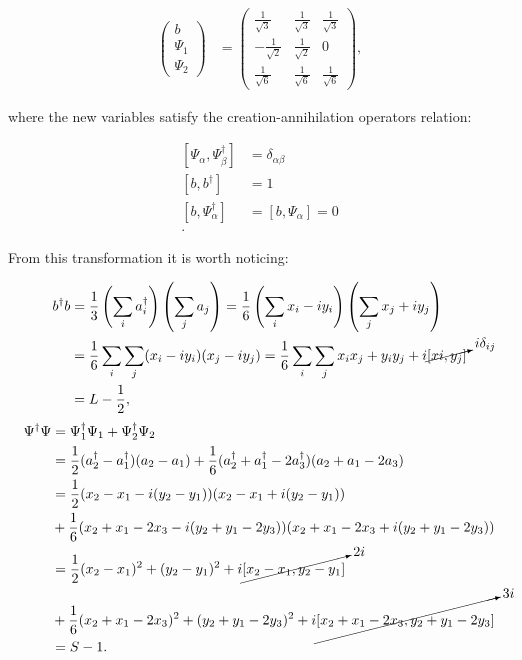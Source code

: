 \begin{align*}
\begin{pmatrix} b \\ \Psi_1 \\ \Psi_2 \end{pmatrix} &= 
\begin{pmatrix}\frac{1}{\sqrt{3}} &\frac{1}{\sqrt{3}}&\frac{1}{\sqrt{3}}\\
				-\frac{1}{\sqrt{2}}&\frac{1}{\sqrt{2}}&0\\
				\frac{1}{\sqrt{6}}&\frac{1}{\sqrt{6}}&\frac{1}{\sqrt{6}}\end{pmatrix},
\end{align*}

where the new variables satisfy the creation-annihilation operators relation:

\begin{align*}
\left[ \Psi_\alpha,\Psi_\beta^\dagger\right] &= \delta_{\alpha\beta}\\
\left[ b,b^\dagger\right] &= 1\\
\left[ b,\Psi_\alpha^\dagger\right] &=\left[ b,\Psi_\alpha\right] = 0\\.
\end{align*}

From this transformation it is worth noticing:

\begin{align*}
b^\dagger b &= \frac{1}{3}\left( \sum_i a_i^\dagger \right)\left( \sum_j a_j \right) =  \frac{1}{6}\left( \sum_i x_i-iy_i \right)\left( \sum_j x_j+iy_j \right)\\
&= \frac{1}{6}\sum_i\sum_j(x_i-iy_i)(x_j-iy_j) = \frac{1}{6}\sum_i\sum_jx_ix_j+y_iy_j +i\cancelto{i\delta_{ij}}{[xi,y_j]}\\
&= L - \frac{1}{2},
\end{align*}
\small
\begin{align*}
\Psi^\dagger\Psi &= \Psi_1^\dagger\Psi_1 +\Psi_2^\dagger\Psi_2\\
&= \frac{1}{2} (a_2^\dagger-a_1^\dagger)(a_2-a_1) + \frac{1}{6}(a_2^\dagger+a_1^\dagger-2a_3^\dagger)(a_2+a_1-2a_3)\\
&= \frac{1}{2} (x_2-x_1 -i(y_2-y_1))(x_2-x_1 +i(y_2-y_1))\\
&+\frac{1}{6}(x_2+x_1-2x_3-i(y_2+y_1-2y_3))(x_2+x_1-2x_3 +i(y_2+y_1-2y_3))\\
&= \frac{1}{2} (x_2-x_1)^2+(y_2-y_1)^2+i\cancelto{2i}{[x_2-x_1,y_2-y_1]} \\
&+ \frac{1}{6} (x_2+x_1-2x_3)^2+(y_2+y_1-2y_3)^2+i\cancelto{3i}{[x_2+x_1-2x_3,y_2+y_1-2y_3]}\\
&= S-1.
\end{align*}
\normalsize

